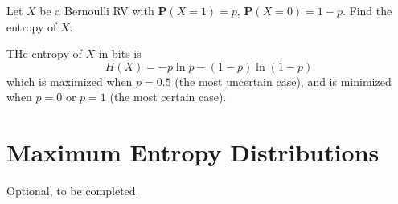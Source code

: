 \begin{example}
    Let $X$ be a Bernoulli RV with $\mathbf{P}(X = 1) = p$, $\mathbf{P}(X = 0) = 1 - p$. Find the entropy of $X$.
\end{example}
\begin{solution}
    THe entropy of $X$ in bits is
    \begin{equation}
        H(X) = -p \ln p - (1 - p) \ln (1 - p)
    \end{equation}
    which is maximized when $p = 0.5$ (the most uncertain case), and is minimized when $p = 0$ or $p = 1$ (the most certain case). 
\end{solution}

\section{Maximum Entropy Distributions}
Optional, to be completed.
